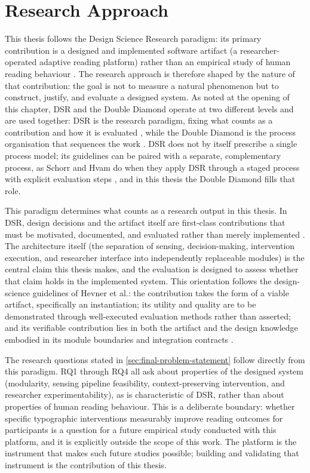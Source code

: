 \section{Research Approach}
\label{sec:research-approach}

This thesis follows the Design Science Research paradigm: its primary contribution is a designed and implemented software artifact (a researcher-operated adaptive reading platform) rather than an empirical study of human reading behaviour \cite{hevner2004designscience, peffers2007dsrm}.
The research approach is therefore shaped by the nature of that contribution: the goal is not to measure a natural phenomenon but to construct, justify, and evaluate a designed system.
As noted at the opening of this chapter, DSR and the Double Diamond operate at two different levels and are used together: DSR is the research paradigm, fixing what counts as a contribution and how it is evaluated \cite{hevner2004designscience}, while the Double Diamond is the process organisation that sequences the work \cite{designcouncil2023diamond}.
DSR does not by itself prescribe a single process model; its guidelines can be paired with a separate, complementary process, as Schorr and Hvam do when they apply DSR through a staged process with explicit evaluation steps \cite{schorr2018dsr, peffers2007dsrm}, and in this thesis the Double Diamond fills that role.

This paradigm determines what counts as a research output in this thesis.
In DSR, design decisions and the artifact itself are first-class contributions that must be motivated, documented, and evaluated rather than merely implemented \cite{hevner2004designscience}.
The architecture itself (the separation of sensing, decision-making, intervention execution, and researcher interface into independently replaceable modules) is the central claim this thesis makes, and the evaluation is designed to assess whether that claim holds in the implemented system.
This orientation follows the design-science guidelines of Hevner et al.: the contribution takes the form of a viable artifact, specifically an instantiation; its utility and quality are to be demonstrated through well-executed evaluation methods rather than asserted; and its verifiable contribution lies in both the artifact and the design knowledge embodied in its module boundaries and integration contracts \cite{hevner2004designscience}.

The research questions stated in \cref{sec:final-problem-statement} follow directly from this paradigm.
RQ1 through RQ4 all ask about properties of the designed system (modularity, sensing pipeline feasibility, context-preserving intervention, and researcher experimentability), as is characteristic of DSR, rather than about properties of human reading behaviour.
This is a deliberate boundary: whether specific typographic interventions measurably improve reading outcomes for participants is a question for a future empirical study conducted with this platform, and it is explicitly outside the scope of this work.
The platform is the instrument that makes such future studies possible; building and validating that instrument is the contribution of this thesis.

